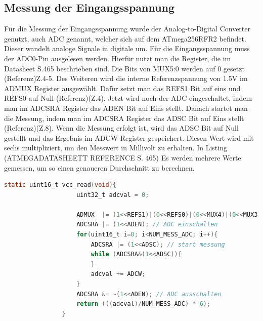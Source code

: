 \documentclass[]{article}
\begin{document}
					
			\subsection{Messung der Eingangsspannung}
			Für die Messung der Eingangsspannung wurde der Analog-to-Digital Converter genutzt, auch ADC genannt, welcher sich auf dem ATmega256RFR2 befindet. Dieser wandelt analoge Signale in digitale um. Für die Eingangsspannung muss der ADC0-Pin ausgelesen werden. Hierfür nutzt man die Register, die im Datasheet S.465 beschrieben sind. Die Bits von MUX5:0 werden auf 0 gesetzt (Referenz)Z.4-5. Des Weiteren wird die interne Referenzspannung von 1.5V im ADMUX Register ausgewählt. Dafür setzt man das REFS1 Bit auf eins und REFS0 auf Null (Referenz)(Z.4). Jetzt wird noch der ADC eingeschaltet, indem man im ADCSRA Register das ADEN Bit auf Eins stellt. Danach startet man die Messung, indem man im ADCSRA Register das ADSC Bit auf Eins stellt (Referenz)(Z.8). Wenn die Messung erfolgt ist, wird das ADSC Bit auf Null gestellt und das Ergebnis im ADCW Register gespeichert. Diesen Wert wird mit sechs multipliziert, um den Messwert in Millivolt zu erhalten. In Listing (ATMEGADATASHEETT REFERENCE S. 465)
			Es werden mehrere Werte gemessen, um so einen genaueren Durchschnitt zu berechnen.
			
			\begin{lstlisting}[language=C,frame=single, caption = Delay Timer, label = delay_timer] 
				static uint16_t vcc_read(void){
					uint32_t adcval = 0;
					
					ADMUX  |= (1<<REFS1)|(0<<REFS0)|(0<<MUX4)|(0<<MUX3)|(0<<MUX2)|(0<<MUX1)|(0<<MUX0);			ADCSRB |= (0<<MUX5);
					ADCSRA |= (1<<ADEN); // ADC einschalten
					for(uint16_t i=0; i<NUM_MESS_ADC; i++){
						ADCSRA |= (1<<ADSC); // start messung
						while (ADCSRA&(1<<ADSC)){
						}
						adcval += ADCW;
					}
					ADCSRA &= ~(1<<ADEN); // ADC ausschalten
					return (((adcval)/NUM_MESS_ADC) * 6);
				}
				
			\end{lstlisting}
			
			
\end{document}
